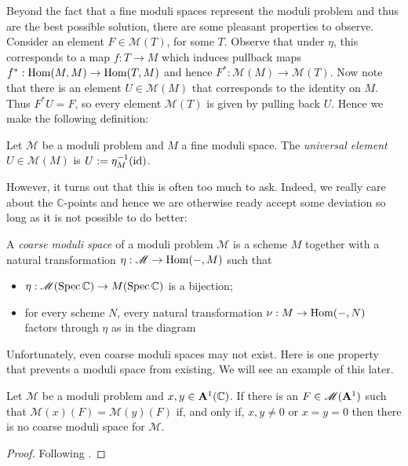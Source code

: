 \documentclass[12pt]{ociamthesis}  %
\begin{document}
Beyond the fact that a fine moduli spaces represent the moduli
problem and thus are the best possible solution, there are some
pleasant properties to observe. Consider an element
$F\in\mathscr M(T)$, for some $T$. Observe that under $\eta$,
this corresponds to a map $f:T\to M$ which induces pullback maps
$f^* : \operatorname{Hom}(M,M)\to\operatorname{Hom}(T,M)$ and hence
$F^* : \mathscr M(M)\to \mathscr M(T)$.
Now note that there is an element $U\in\mathscr M(M)$ that
corresponds to the identity on $M$. Thus $F^* U = F$, so every
element $\mathscr M(T)$ is given by pulling back $U$. Hence
we make the following definition:

\begin{definition}
  Let $\mathscr M$ be a moduli problem and $M$ a fine moduli space.
  The \emph{universal element} $U\in\mathscr M(M)$ is
  $U:=\eta^{-1}_M (\operatorname{id})$.
\end{definition}

\begin{example}
  \missingexample
\end{example}

However, it turns out that this is often too much to ask. Indeed,
we really care about the $\mathbb{C}$-points and hence
we are otherwise ready accept some deviation so long as it is not
possible to do better:

\begin{definition}\missingcitation
  A \emph{coarse moduli space} of a moduli problem $\mathscr M$
  is a scheme $M$ together with a natural transformation
  $\eta : \mathscr M \to \operatorname{Hom}(-,M)$ such that
  \begin{itemize}
    \item $\eta : \mathscr M(\operatorname{Spec}\mathbb{C})\to M(\operatorname{Spec}\mathbb{C})$ is a bijection;
    \item for every scheme $N$, every natural transformation
      $\nu : M \to \operatorname{Hom}(-,N)$ factors through $\eta$ as in the diagram
  \end{itemize}
\end{definition}

\begin{example}
  \missingexample
\end{example}

Unfortunately, even coarse moduli spaces may not exist. Here is
one property that prevents a moduli space from existing. We will
see an example of this later. 

\begin{lemma}\label{lem:no_coarse_condition}
  Let $\mathscr M$ be a moduli problem and
  $x,y\in \mathbf{A}^{1}_{}(\mathbb{C})$. If there is an
  $F\in\mathscr M(\mathbf{A}^{1}_{})$ such that
  $\mathscr M(x)(F) = \mathscr M(y)(F)$ if, and only if,
  $x,y\neq 0$ or $x=y=0$ then there is no coarse moduli space
  for $\mathscr M$.
  \begin{proof}
    Following \cite[Lemma 2.27]{hoskins2016}.
    \missingproof
  \end{proof}
\end{lemma}
\end{document}
